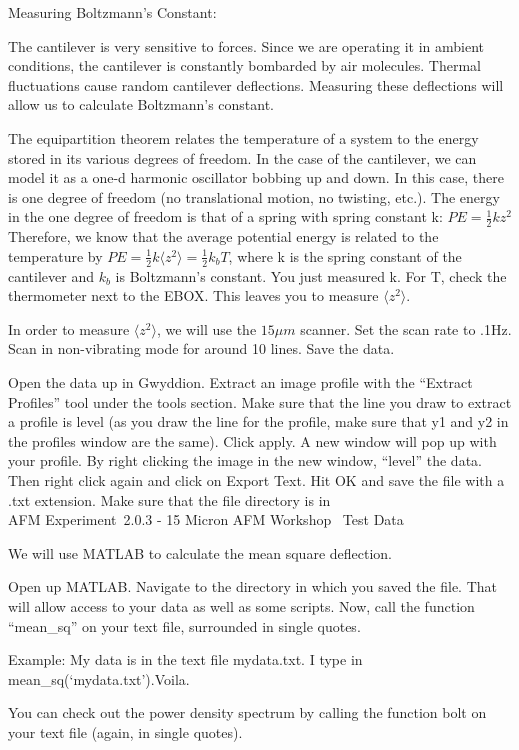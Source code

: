 \documentclass{../lab}
\begin{document}
{Measuring Boltzmann's Constant:

The cantilever is very sensitive to forces. Since we are operating it in ambient conditions, the cantilever is constantly bombarded by air molecules. Thermal fluctuations cause random cantilever deflections. Measuring these deflections will allow us to calculate Boltzmann’s constant.

The equipartition theorem relates the temperature of a system to the energy stored in its various degrees of freedom. In the case of the cantilever, we can model it as a one-d harmonic oscillator bobbing up and down. In this case, there is one degree of freedom (no translational motion, no twisting, etc.). The energy in the one degree of freedom is that of a spring with spring constant k: $PE = \frac{1}{2} kz^{2}$ Therefore, we know that the average potential energy is related to the temperature by $PE = \frac{1}{2} k \langle z^{2} \rangle = \frac{1}{2} k_{b} T$, where k is the spring constant of the cantilever and $k_{b}$ is Boltzmann’s constant. You just measured k. For T, check the thermometer next to the EBOX. This leaves you to measure $\langle z^{2} \rangle$.

In order to measure $\langle z^{2} \rangle$, we will use the $15\mu m$ scanner. Set the scan rate to .1Hz. Scan in non-vibrating mode for around 10 lines. Save the data.

Open the data up in Gwyddion. Extract an image profile with the ``Extract Profiles'' tool under the tools section. Make sure that the line you draw to extract a profile is level (as you draw the line for the profile, make sure that y1 and y2 in the profiles window are the same). Click apply. A new window will pop up with your profile.  By right clicking the image in the new window, ``level'' the data. Then right click again and click on Export Text. Hit OK and save the file with a .txt extension. Make sure that the file directory is in \\AFM Experiment\ 2.0.3 - 15 Micron AFM Workshop \ Test Data

We will use MATLAB to calculate the mean square deflection.

Open up MATLAB. Navigate to the directory in which you saved the file. That will allow access to your data as well as some scripts. Now, call the function ``mean\_sq'' on your text file, surrounded in single quotes.

Example: My data is in the text file mydata.txt. I type in mean\_sq(‘mydata.txt’).Voila.

You can check out the power density spectrum by calling the function bolt on your text file (again, in single quotes).

}
\end{document}
